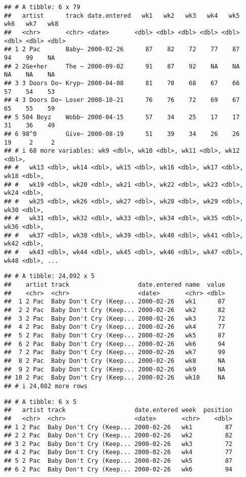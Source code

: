 \documentclass[
]{article}
\begin{document}
\begin{verbatim}
## # A tibble: 6 x 79
##   artist      track date.entered   wk1   wk2   wk3   wk4   wk5   wk6   wk7   wk8
##   <chr>       <chr> <date>       <dbl> <dbl> <dbl> <dbl> <dbl> <dbl> <dbl> <dbl>
## 1 2 Pac       Baby~ 2000-02-26      87    82    72    77    87    94    99    NA
## 2 2Ge+her     The ~ 2000-09-02      91    87    92    NA    NA    NA    NA    NA
## 3 3 Doors Do~ Kryp~ 2000-04-08      81    70    68    67    66    57    54    53
## 4 3 Doors Do~ Loser 2000-10-21      76    76    72    69    67    65    55    59
## 5 504 Boyz    Wobb~ 2000-04-15      57    34    25    17    17    31    36    49
## 6 98^0        Give~ 2000-08-19      51    39    34    26    26    19     2     2
## # i 68 more variables: wk9 <dbl>, wk10 <dbl>, wk11 <dbl>, wk12 <dbl>,
## #   wk13 <dbl>, wk14 <dbl>, wk15 <dbl>, wk16 <dbl>, wk17 <dbl>, wk18 <dbl>,
## #   wk19 <dbl>, wk20 <dbl>, wk21 <dbl>, wk22 <dbl>, wk23 <dbl>, wk24 <dbl>,
## #   wk25 <dbl>, wk26 <dbl>, wk27 <dbl>, wk28 <dbl>, wk29 <dbl>, wk30 <dbl>,
## #   wk31 <dbl>, wk32 <dbl>, wk33 <dbl>, wk34 <dbl>, wk35 <dbl>, wk36 <dbl>,
## #   wk37 <dbl>, wk38 <dbl>, wk39 <dbl>, wk40 <dbl>, wk41 <dbl>, wk42 <dbl>,
## #   wk43 <dbl>, wk44 <dbl>, wk45 <dbl>, wk46 <dbl>, wk47 <dbl>, wk48 <dbl>, ...
\end{verbatim}

\begin{verbatim}
## # A tibble: 24,092 x 5
##    artist track                   date.entered name  value
##    <chr>  <chr>                   <date>       <chr> <dbl>
##  1 2 Pac  Baby Don't Cry (Keep... 2000-02-26   wk1      87
##  2 2 Pac  Baby Don't Cry (Keep... 2000-02-26   wk2      82
##  3 2 Pac  Baby Don't Cry (Keep... 2000-02-26   wk3      72
##  4 2 Pac  Baby Don't Cry (Keep... 2000-02-26   wk4      77
##  5 2 Pac  Baby Don't Cry (Keep... 2000-02-26   wk5      87
##  6 2 Pac  Baby Don't Cry (Keep... 2000-02-26   wk6      94
##  7 2 Pac  Baby Don't Cry (Keep... 2000-02-26   wk7      99
##  8 2 Pac  Baby Don't Cry (Keep... 2000-02-26   wk8      NA
##  9 2 Pac  Baby Don't Cry (Keep... 2000-02-26   wk9      NA
## 10 2 Pac  Baby Don't Cry (Keep... 2000-02-26   wk10     NA
## # i 24,082 more rows
\end{verbatim}

\begin{verbatim}
## # A tibble: 6 x 5
##   artist track                   date.entered week  position
##   <chr>  <chr>                   <date>       <chr>    <dbl>
## 1 2 Pac  Baby Don't Cry (Keep... 2000-02-26   wk1         87
## 2 2 Pac  Baby Don't Cry (Keep... 2000-02-26   wk2         82
## 3 2 Pac  Baby Don't Cry (Keep... 2000-02-26   wk3         72
## 4 2 Pac  Baby Don't Cry (Keep... 2000-02-26   wk4         77
## 5 2 Pac  Baby Don't Cry (Keep... 2000-02-26   wk5         87
## 6 2 Pac  Baby Don't Cry (Keep... 2000-02-26   wk6         94
\end{verbatim}
\end{document}
